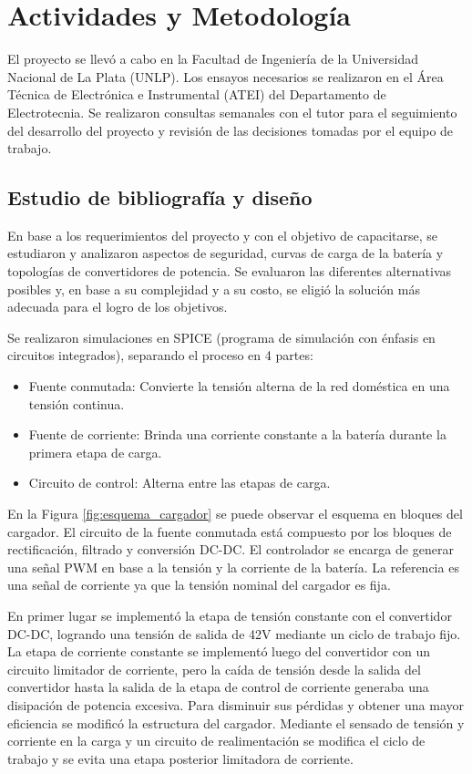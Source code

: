 \section{Actividades y Metodología}


El proyecto se llevó a cabo en la Facultad de Ingeniería de la Universidad Nacional de La Plata (UNLP).
Los ensayos necesarios se realizaron en el Área Técnica de Electrónica e Instrumental (ATEI) del Departamento de Electrotecnia.
Se realizaron consultas semanales con el tutor para el seguimiento del desarrollo del proyecto y
revisión de las decisiones tomadas por el equipo de trabajo.

\subsection{Estudio de bibliografía y diseño} \label{subsection:estudio_bibliografia}

En base a los requerimientos del proyecto y con el objetivo de capacitarse, se estudiaron y analizaron aspectos de seguridad, 
curvas de carga de la batería y topologías de convertidores de potencia. 
Se evaluaron las diferentes alternativas posibles y, en base a su complejidad y a su costo,
se eligió la solución más adecuada para el logro de los objetivos. 

Se realizaron simulaciones en SPICE (programa de simulación con énfasis en circuitos integrados),
separando el proceso en 4 partes:
\begin{itemize}
    \item Fuente conmutada: Convierte la tensión alterna de la red doméstica en una tensión continua.
    \item Fuente de corriente: Brinda una corriente constante a la batería durante la primera etapa de carga.
    \item Circuito de control: Alterna entre las etapas de carga.
\end{itemize}

En la Figura \ref{fig:esquema_cargador} se puede observar el esquema en bloques del cargador.
El circuito de la fuente conmutada está compuesto por los bloques de rectificación, filtrado y conversión DC-DC.
El controlador se encarga de generar una señal PWM en base a la tensión y la corriente de la batería.
La referencia es una señal de corriente ya que la tensión nominal del cargador es fija.

En primer lugar se implementó la etapa de tensión constante con el convertidor DC-DC, logrando una tensión de salida de 42V mediante un ciclo de trabajo fijo. 
La etapa de corriente constante se implementó luego del convertidor con un circuito limitador de corriente,
pero la caída de tensión desde la salida del convertidor hasta la salida de la etapa de control de corriente generaba una disipación de potencia excesiva.
Para disminuir sus pérdidas y obtener una mayor eficiencia se modificó la estructura del cargador. 
Mediante el sensado de tensión y corriente en la carga y un circuito de realimentación se modifica el ciclo de trabajo y se evita una etapa posterior limitadora de corriente.

